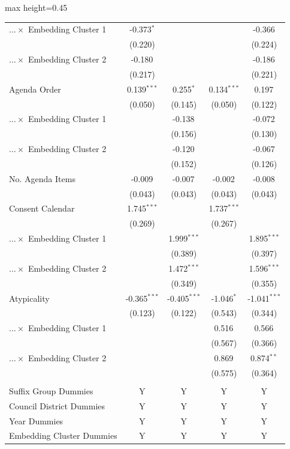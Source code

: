 \begin{table}[H]
\begin{adjustbox}{max height=0.45\textheight}
\begin{threeparttable}
\begin{tabular}{lcccc}
$\ldots \times$ Embedding Cluster 1  & -0.373$^{*}$ &  &  & -0.366$^{}$ \\
 & (0.220) &  &  & (0.224) \\ [1.8ex]
$\ldots \times$ Embedding Cluster 2  & -0.180$^{}$ &  &  & -0.186$^{}$ \\
 & (0.217) &  &  & (0.221) \\ [1.8ex]
Agenda Order  & 0.139$^{***}$ & 0.255$^{*}$ & 0.134$^{***}$ & 0.197$^{}$ \\
 & (0.050) & (0.145) & (0.050) & (0.122) \\ [1.8ex]
$\ldots \times$ Embedding Cluster 1  &  & -0.138$^{}$ &  & -0.072$^{}$ \\
 &  & (0.156) &  & (0.130) \\ [1.8ex]
$\ldots \times$ Embedding Cluster 2  &  & -0.120$^{}$ &  & -0.067$^{}$ \\
 &  & (0.152) &  & (0.126) \\ [1.8ex]
No. Agenda Items  & -0.009$^{}$ & -0.007$^{}$ & -0.002$^{}$ & -0.008$^{}$ \\
 & (0.043) & (0.043) & (0.043) & (0.043) \\ [1.8ex]
Consent Calendar  & 1.745$^{***}$ &  & 1.737$^{***}$ &  \\
 & (0.269) &  & (0.267) &  \\ [1.8ex]
$\ldots \times$ Embedding Cluster 1  &  & 1.999$^{***}$ &  & 1.895$^{***}$ \\
 &  & (0.389) &  & (0.397) \\ [1.8ex]
$\ldots \times$ Embedding Cluster 2  &  & 1.472$^{***}$ &  & 1.596$^{***}$ \\
 &  & (0.349) &  & (0.355) \\ [1.8ex]
Atypicality  & -0.365$^{***}$ & -0.405$^{***}$ & -1.046$^{*}$ & -1.041$^{***}$ \\
 & (0.123) & (0.122) & (0.543) & (0.344) \\ [1.8ex]
$\ldots \times$ Embedding Cluster 1  &  &  & 0.516$^{}$ & 0.566$^{}$ \\
 &  &  & (0.567) & (0.366) \\ [1.8ex]
$\ldots \times$ Embedding Cluster 2  &  &  & 0.869$^{}$ & 0.874$^{**}$ \\
 &  &  & (0.575) & (0.364) \\ [1.8ex]

 & & & & \\ 
Suffix Group Dummies  & Y  & Y  & Y  & Y  \\ 
Council District Dummies  & Y  & Y  & Y  & Y  \\ 
Year Dummies  & Y  & Y  & Y  & Y  \\ 
Embedding Cluster Dummies  & Y  & Y  & Y  & Y  \\ 


\end{tabular}
\end{threeparttable}
\end{adjustbox}
\end{table}
